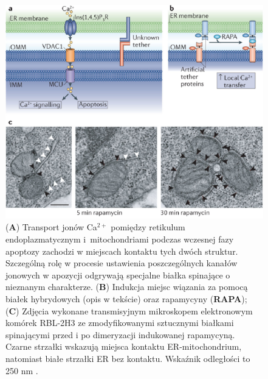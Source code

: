 \begin{figure}[tb]
\centering
\includegraphics[width=1\textwidth]{rysunki/rozdzial_1/apoptosis_rapa.png}
\caption[Transport jonów Ca$^{2+}$ pomiędzy ER i mitochondriami podczas apoptozy]{ (\textbf{A}) Transport jonów Ca$^{2+}$ pomiędzy retikulum endoplazmatycznym i~mitochondriami podczas wczesnej fazy apoptozy zachodzi w miejscach kontaktu tych dwóch struktur. Szczególną rolę w procesie ustawienia poszczególnych kanałów jonowych w apozycji odgrywają specjalne białka spinające o nieznanym charakterze. (\textbf{B}) Indukcja miejsc wiązania za pomocą białek hybrydowych (opis w tekście) oraz rapamycyny (\textbf{RAPA}); (\textbf{C}) Zdjęcia wykonane transmisyjnym mikroskopem elektronowym komórek RBL-2H3 ze zmodyfikowanymi sztucznymi białkami spinającymi przed i po dimeryzacji indukowanej rapamycyną. Czarne strzałki wskazują miejsca kontaktu ER-mitochondrium, natomiast białe strzałki ER bez kontaktu. Wskaźnik odległości to 250 nm \cite{Rowland2012}.}
\label{fig:apoptoza2}
\end{figure}

